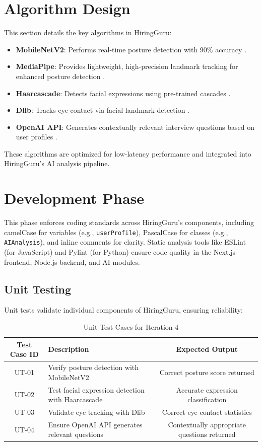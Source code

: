 \section{Algorithm Design}
This section details the key algorithms in HiringGuru:
\begin{itemize}
    \item \textbf{MobileNetV2}: Performs real-time posture detection with 90\% accuracy \cite{howard2018mobilenetv2}.
    \item \textbf{MediaPipe}: Provides lightweight, high-precision landmark tracking for enhanced posture detection \cite{lugaresi2019mediapipe}.
    \item \textbf{Haarcascade}: Detects facial expressions using pre-trained cascades \cite{viola2001haar}.
    \item \textbf{Dlib}: Tracks eye contact via facial landmark detection \cite{king2009dlib}.
    \item \textbf{OpenAI API}: Generates contextually relevant interview questions based on user profiles \cite{openai2023api}.
\end{itemize}
These algorithms are optimized for low-latency performance and integrated into HiringGuru’s AI analysis pipeline.

\section{Development Phase}
This phase enforces coding standards across HiringGuru’s components, including camelCase for variables (e.g., \texttt{userProfile}), PascalCase for classes (e.g., \texttt{AIAnalysis}), and inline comments for clarity. Static analysis tools like ESLint (for JavaScript) and Pylint (for Python) ensure code quality in the Next.js frontend, Node.js backend, and AI modules.

\subsection{Unit Testing}
Unit tests validate individual components of HiringGuru, ensuring reliability:

\begin{table}[!htbp]
\centering
\begin{tabular}{|c|p{6cm}|c|}
\hline
\textbf{Test Case ID} & \textbf{Description} & \textbf{Expected Output} \\
\hline
UT-01 & Verify posture detection with MobileNetV2 & Correct posture score returned \\
\hline
UT-02 & Test facial expression detection with Haarcascade & Accurate expression classification \\
\hline
UT-03 & Validate eye tracking with Dlib & Correct eye contact statistics \\
\hline
UT-04 & Ensure OpenAI API generates relevant questions & Contextually appropriate questions returned \\
\hline
\end{tabular}
\caption{Unit Test Cases for Iteration 4}
\label{tab:unit-test-cases}
\end{table}

